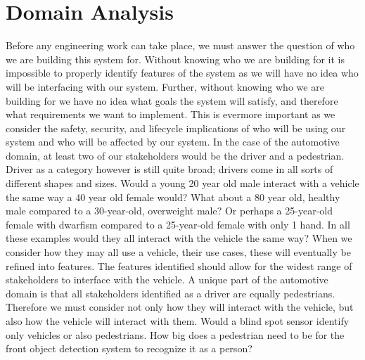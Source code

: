 \section{Domain Analysis}

Before any engineering work can take place, we must answer the question of who we are building this system for. Without knowing who we are building for it is impossible to properly identify features of the system as we will have no idea who will be interfacing with our system. Further, without knowing who we are building for we have no idea what goals the system will satisfy, and therefore what requirements we want to implement. This is evermore important as we consider the safety, security, and lifecycle implications of who will be using our system and who will be affected by our system. In the case of the automotive domain, at least two of our stakeholders would be the driver and a pedestrian. Driver as a category however is still quite broad; drivers come in all sorts of different shapes and sizes. Would a young 20 year old male interact with a vehicle the same way a 40 year old female would? What about a 80 year old, healthy male compared to a 30-year-old, overweight male? Or perhaps a 25-year-old female with dwarfism compared to a 25-year-old female with only 1 hand. In all these examples would they all interact with the vehicle the same way? When we consider how they may all use a vehicle, their use cases, these will eventually be refined into features. The features identified should allow for the widest range of stakeholders to interface with the vehicle. A unique part of the automotive domain is that all stakeholders identified as a driver are equally pedestrians. Therefore we must consider not only how they will interact with the vehicle, but also how the vehicle will interact with them. Would a blind spot sensor identify only vehicles or also pedestrians. How big does a pedestrian need to be for the front object detection system to recognize it as a person? 

